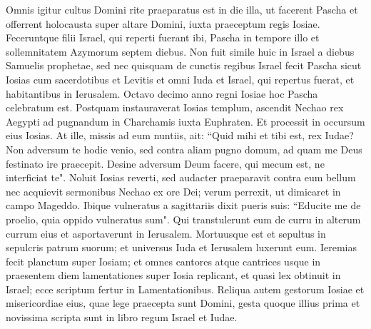 \begin{biblechapter}
\verse Omnis igitur cultus Domini rite praeparatus est in die illa, ut facerent Pascha et offerrent holocausta super altare Domini, iuxta praeceptum regis Iosiae. 
\verse Feceruntque filii Israel, qui reperti fuerant ibi, Pascha in tempore illo et sollemnitatem Azymorum septem diebus. 
\verse Non fuit simile huic in Israel a diebus Samuelis prophetae, sed nec quisquam de cunctis regibus Israel fecit Pascha sicut Iosias cum sacerdotibus et Levitis et omni Iuda et Israel, qui repertus fuerat, et habitantibus in Ierusalem. 
\verse Octavo decimo anno regni Iosiae hoc Pascha celebratum est. 
\verse Postquam instauraverat Iosias templum, ascendit Nechao rex Aegypti ad pugnandum in Charchamis iuxta Euphraten. Et processit in occursum eius Iosias. 
\verse At ille, missis ad eum nuntiis, ait: “Quid mihi et tibi est, rex Iudae? Non adversum te hodie venio, sed contra aliam pugno domum, ad quam me Deus festinato ire praecepit. Desine adversum Deum facere, qui mecum est, ne interficiat te". 
\verse Noluit Iosias reverti, sed audacter praeparavit contra eum bellum nec acquievit sermonibus Nechao ex ore Dei; verum perrexit, ut dimicaret in campo Mageddo. 
\verse Ibique vulneratus a sagittariis dixit pueris suis: “Educite me de proelio, quia oppido vulneratus sum". 
\verse Qui transtulerunt eum de curru in alterum currum eius et asportaverunt in Ierusalem. Mortuusque est et sepultus in sepulcris patrum suorum; et universus Iuda et Ierusalem luxerunt eum. 
\verse Ieremias fecit planctum super Iosiam; et omnes cantores atque cantrices usque in praesentem diem lamentationes super Iosia replicant, et quasi lex obtinuit in Israel; ecce scriptum fertur in Lamentationibus. 
\verse Reliqua autem gestorum Iosiae et misericordiae eius, quae lege praecepta sunt Domini, 
\verse gesta quoque illius prima et novissima scripta sunt in libro regum Israel et Iudae. 
\end{biblechapter}

